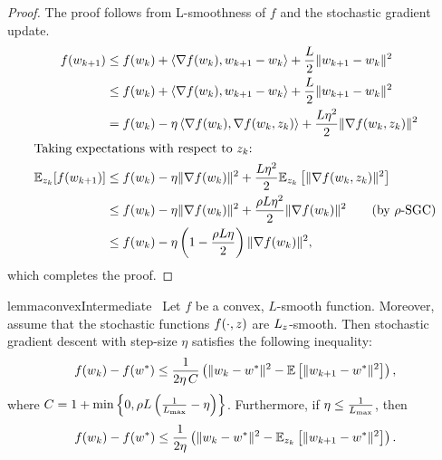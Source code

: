 \begin{proof}
    The proof follows from L-smoothness of \( f \) and the stochastic gradient update.
    \begin{align*}
        f(w_{k+1}) &\leq f(w_k) + \left\langle\nabla f(w_k), w_{k+1} - w_k\right\rangle + \frac{L}{2}\|w_{k+1} - w_k\|^2\\
        &\leq f(w_k) + \left\langle\nabla f(w_k), w_{k+1} - w_k\right\rangle + \frac{L}{2}\|w_{k+1} - w_k\|^2\\
        &= f(w_k) - \eta \left\langle\nabla f(w_k), \nabla f(w_k, z_{k})\right\rangle + \frac{L \eta^2}{2}\|\nabla f(w_k, z_{k})\|^2\\
        \intertext{Taking expectations with respect to \( z_{k}\):}
        \mathbb{E}_{z_{k}}[f(w_{k+1})] &\leq f(w_k) - \eta \|\nabla f(w_k)\|^2 + \frac{L \eta^2}{2}\mathbb{E}_{z_{k}} \left[\|\nabla f(w_k, z_{k})\|^2\right]\\
        &\leq f(w_k) - \eta \|\nabla f(w_k)\|^2 + \frac{\rho L \eta^2}{2} \|\nabla f(w_k)\|^2 \tag{by \( \rho \)-SGC}\\
        &\leq f(w_k) - \eta \left(1 - \frac{\rho L \eta}{2}\right)\|\nabla f(w_k)\|^2,
    \end{align*}
    which completes the proof.
\end{proof}

\begin{restatable}{lemma}{convexIntermediate}~\label{lemma:convex-intermediate}
    Let \( f \) be a convex, \( L \)-smooth function.
    Moreover, assume that the stochastic functions \( f(\cdot, z) \) are \( L_z \)-smooth.
    Then stochastic gradient descent with step-size \( \eta \) satisfies the following inequality: 
    \[ f(w_k) - f(w^*) \leq \frac{1}{2\eta \, C} \left(\|w_k - w^*\|^2 - \mathbb{E} \left[\|w_{k+1} - w^*\|^2\right]\right), \]
    where \(  C = 1 + \min \left\{ 0, \rho L \left(\frac{1}{L_{\text{max}}} - \eta \right)\right\} \). 
    Furthermore, if \( \eta \leq \frac{1}{L_{\text{max}}} \), then 
    \[ f(w_k) - f(w^*) \leq \frac{1}{2 \eta}\left(\|w_k - w^*\|^2 - \mathbb{E}_{z_{k}}\left[\|w_{k+1} - w^*\|^2\right]\right). \]
\end{restatable}

